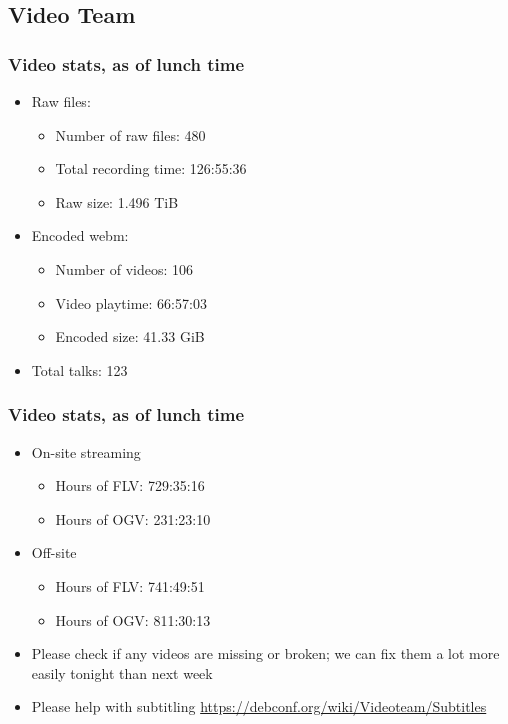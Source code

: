 \documentclass[t]{beamer}
\begin{document}
\subsection{Video Team}

\begin{frame}
	\frametitle{Video stats, as of lunch time}
	\begin{itemize}
		\item Raw files:
		\begin{itemize}
			\item Number of raw files: 480
			\item Total recording time: 126:55:36
			\item Raw size: 1.496 TiB
		\end{itemize}
		\item Encoded webm:
		\begin{itemize}
			\item Number of videos: 106
			\item Video playtime: 66:57:03
			\item Encoded size: 41.33 GiB
		\end{itemize}
		\item Total talks: 123
	\end{itemize}
\end{frame}

\begin{frame}
	\frametitle{Video stats, as of lunch time}
	\begin{itemize}
		\item On-site streaming
		\begin{itemize}
			\item Hours of FLV: 729:35:16
			\item Hours of OGV: 231:23:10
		\end{itemize}
		\item Off-site
		\begin{itemize}
			\item Hours of FLV: 741:49:51
			\item Hours of OGV: 811:30:13
		\end{itemize}
	\item Please check if any videos are missing or broken; we can fix them a lot more easily tonight than next week
	\item Please help with subtitling \url{https://debconf.org/wiki/Videoteam/Subtitles}
	\end{itemize}
\end{frame}
\end{document}
